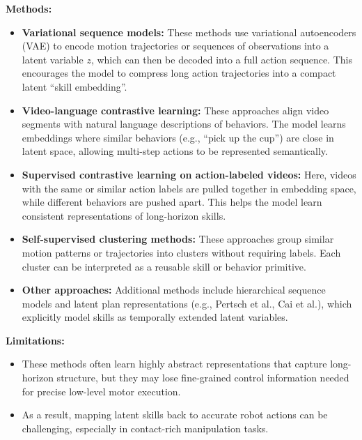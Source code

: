 \textbf{Methods:}
\begin{itemize}
    \item \textbf{Variational sequence models:} These methods use variational autoencoders (VAE) to encode motion trajectories or sequences of observations into a latent variable $z$, which can then be decoded into a full action sequence. This encourages the model to compress long action trajectories into a compact latent “skill embedding”.

    \item \textbf{Video-language contrastive learning:} These approaches align video segments with natural language descriptions of behaviors. The model learns embeddings where similar behaviors (e.g., “pick up the cup”) are close in latent space, allowing multi-step actions to be represented semantically.

    \item \textbf{Supervised contrastive learning on action-labeled videos:} Here, videos with the same or similar action labels are pulled together in embedding space, while different behaviors are pushed apart. This helps the model learn consistent representations of long-horizon skills.

    \item \textbf{Self-supervised clustering methods:} These approaches group similar motion patterns or trajectories into clusters without requiring labels. Each cluster can be interpreted as a reusable skill or behavior primitive.

    \item \textbf{Other approaches:} Additional methods include hierarchical sequence models and latent plan representations (e.g., Pertsch et al., Cai et al.), which explicitly model skills as temporally extended latent variables.
\end{itemize}

\textbf{Limitations:}
\begin{itemize}
    \item These methods often learn highly abstract representations that capture long-horizon structure, but they may lose fine-grained control information needed for precise low-level motor execution.
    \item As a result, mapping latent skills back to accurate robot actions can be challenging, especially in contact-rich manipulation tasks.
\end{itemize}




















